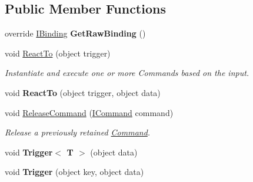 \subsection*{Public Member Functions}
\begin{DoxyCompactItemize}
\item 
\hypertarget{classbabel_1_1extensions_1_1command_1_1impl_1_1_command_binder_a979753b42f167f16ae39f178296ee909}{override \hyperlink{interfacebabel_1_1framework_1_1api_1_1_i_binding}{I\-Binding} {\bfseries Get\-Raw\-Binding} ()}\label{classbabel_1_1extensions_1_1command_1_1impl_1_1_command_binder_a979753b42f167f16ae39f178296ee909}

\item 
void \hyperlink{classbabel_1_1extensions_1_1command_1_1impl_1_1_command_binder_a9d286dbf28eb4b1ebf7e2c45b8a74d21}{React\-To} (object trigger)
\begin{DoxyCompactList}\small\item\em Instantiate and execute one or more Commands based on the input. \end{DoxyCompactList}\item 
\hypertarget{classbabel_1_1extensions_1_1command_1_1impl_1_1_command_binder_adf768bc0eafab66e8bd87a75b8b44804}{void {\bfseries React\-To} (object trigger, object data)}\label{classbabel_1_1extensions_1_1command_1_1impl_1_1_command_binder_adf768bc0eafab66e8bd87a75b8b44804}

\item 
void \hyperlink{classbabel_1_1extensions_1_1command_1_1impl_1_1_command_binder_a5f254fbeda04e19eabdd104458210087}{Release\-Command} (\hyperlink{interfacebabel_1_1extensions_1_1command_1_1api_1_1_i_command}{I\-Command} command)
\begin{DoxyCompactList}\small\item\em Release a previously retained \hyperlink{classbabel_1_1extensions_1_1command_1_1impl_1_1_command}{Command}. \end{DoxyCompactList}\item 
\hypertarget{classbabel_1_1extensions_1_1command_1_1impl_1_1_command_binder_a28178b4899ba1f1e874cd2e87b9c5362}{void {\bfseries Trigger$<$ T $>$} (object data)}\label{classbabel_1_1extensions_1_1command_1_1impl_1_1_command_binder_a28178b4899ba1f1e874cd2e87b9c5362}

\item 
\hypertarget{classbabel_1_1extensions_1_1command_1_1impl_1_1_command_binder_a0f5f258056155eaf04c16b8dfb00bcdb}{void {\bfseries Trigger} (object key, object data)}\label{classbabel_1_1extensions_1_1command_1_1impl_1_1_command_binder_a0f5f258056155eaf04c16b8dfb00bcdb}


\end{DoxyCompactItemize}
